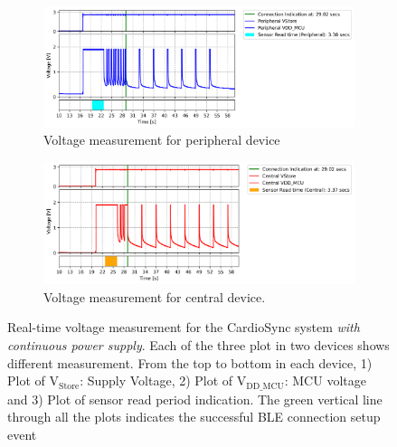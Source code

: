 \begin{figure}[ht]
    \begin{subfigure}{1\linewidth}
        \centering
        \includegraphics[width=1\linewidth]{chapters/Results/Connection_cardiosync_continous_peripheral.png}
        \caption{Voltage measurement for peripheral device}
        \label{fig:continous_connection_cardiosync_peripheral}
        \vspace{1\baselineskip}
    \end{subfigure}
    \begin{subfigure}{1\linewidth}
        \centering
        \includegraphics[width=1\linewidth]{chapters/Results/Connection_cardiosync_continous_central.png}
        \caption{Voltage measurement for central device.}
        \label{fig:continous_connection_cardiosync_central}
    \end{subfigure}
    \caption{Real-time voltage measurement for the CardioSync system \textit{with continuous power supply}. Each of the three plot in two devices shows different measurement. From the top to bottom in each device, 1) Plot of \(\text{V}_\text{Store}\): Supply Voltage, 2) Plot of \(\text{V}_\text{DD\_MCU}\): MCU voltage and 3) Plot of sensor read period indication. The green vertical line through all the plots indicates the successful BLE connection setup event}
    \label{fig:continous_connection_cardiosync}
\end{figure}

